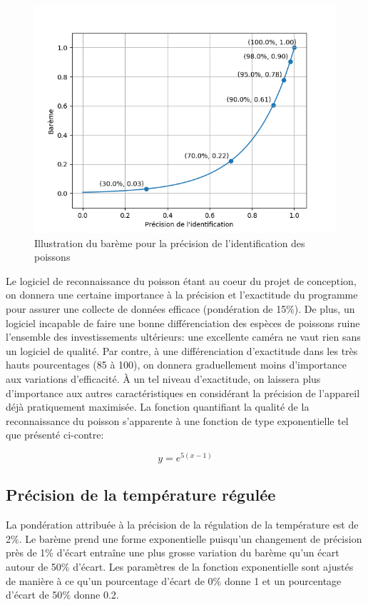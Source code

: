 \begin{figure}[htb!]
    \centering
    \includegraphics[width=0.45\linewidth]{fig/bareme_ident.png}
    \caption{Illustration du barème pour la précision de l'identification des poissons}
    \label{fig:bareme_precision}
\end{figure}

Le logiciel de reconnaissance du poisson étant au coeur du projet de conception, on donnera une certaine importance à la précision et l'exactitude du programme pour assurer une collecte de données efficace (pondération de 15\%). De plus, un logiciel incapable de faire une bonne différenciation des espèces de poissons ruine l'ensemble des investissements ultérieurs: une excellente caméra ne vaut rien sans un logiciel de qualité. Par contre, à une différenciation d'exactitude dans les très hauts pourcentages (85 à 100), on donnera graduellement moins d'importance aux variations d'efficacité. À un tel niveau d'exactitude, on laissera plus d'importance aux autres caractéristiques en considérant la précision de l'appareil déjà pratiquement maximisée. La fonction quantifiant la qualité de la reconnaissance du poisson s'apparente à une fonction de type exponentielle tel que présenté ci-contre:

\begin{equation}
    y = e^{5(x-1)}
    \label{eq:bareme_precision}
\end{equation}

\subsection{Précision de la température régulée}

La pondération attribuée à la précision de la régulation de la température est de 2$\%$. Le barème prend une forme exponentielle puisqu'un changement de précision près de 1$\%$ d'écart entraîne une plus grosse variation du barème qu'un écart autour de 50$\%$ d'écart. Les paramètres de la fonction exponentielle sont ajustés de manière à ce qu'un pourcentage d'écart de 0$\%$ donne 1 et un pourcentage d'écart de 50$\%$ donne 0.2.

